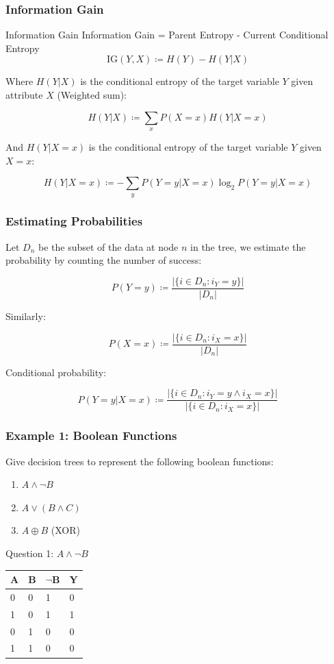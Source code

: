 \documentclass[aspectratio=169, 10pt]{beamer}
\begin{document}
\begin{frame}
\frametitle{Information Gain}

\begin{block}{Information Gain}
    Information Gain = Parent Entropy - Current Conditional Entropy
    \[
        \text{IG}(Y, X) \coloneqq H(Y) - H(Y|X)
    \]
\end{block}
Where $H(Y|X)$ is the conditional entropy of the target variable $Y$ given attribute $X$ (Weighted sum):

\[
    H(Y|X) \coloneqq \sum_x P(X=x)H(Y|X=x)
\]

And $H(Y|X=x)$ is the conditional entropy of the target variable $Y$ given $X=x$:

\[
    H(Y|X=x) \coloneqq - \sum_y P(Y=y|X=x) \log_2 P(Y=y|X=x)
\]

\end{frame}

\begin{frame}
\frametitle{Estimating Probabilities}

Let $D_n$ be the subset of the data at node $n$ in the tree, we estimate the probability by counting the number of success:

\[
    P(Y=y) \coloneqq \frac{|\{i \in D_n : i_Y = y\}|}{|D_n|}
\]

Similarly:

\[
    P(X=x) \coloneqq \frac{|\{i \in D_n : i_X = x\}|}{|D_n|}
\]

Conditional probability:

\[
    P(Y=y | X=x) \coloneqq \frac{|\{i \in D_n : i_Y = y \land i_X = x\}|}{|\{i \in D_n : i_X = x \}|}
\]

\end{frame}

\begin{frame}
\frametitle{Example 1: Boolean Functions}
Give decision trees to represent the following boolean functions:
\begin{enumerate}
    \item $A \land \neg B$
    \item $A \lor (B \land C)$
    \item $A \oplus B$ (XOR)
\end{enumerate}

Question 1: $A \land \neg B$

\begin{table}[]
    \begin{tabular}{lll|l}
    A & B & $\neg$B & Y \\ \hline
    0 & 0 & 1 & 0 \\
    1 & 0 & 1 & 1 \\
    0 & 1 & 0 & 0 \\
    1 & 1 & 0 & 0
    \end{tabular}
\end{table}
    
\end{frame}
\end{document}
